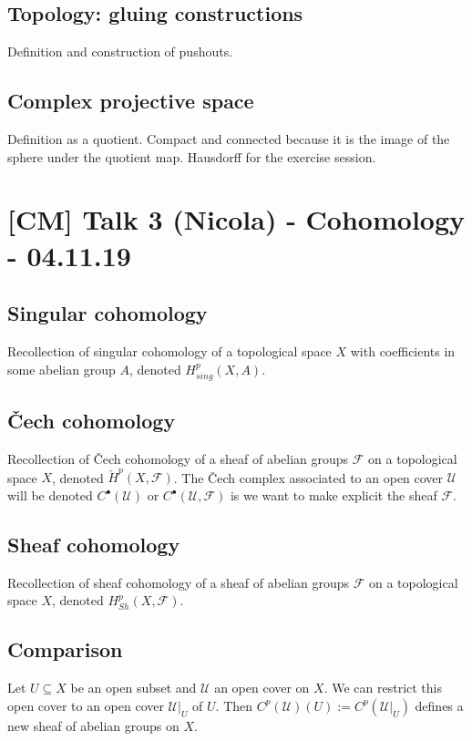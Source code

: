 \documentclass[11pt,A4]{article}
\theoremstyle{plain}
\theoremstyle{definition}
\theoremstyle{remark}
\newcommand{\1}{\mathbbm{1}}
\newcommand{\F}{\mathcal{F}}
\newcommand{\U}{\mathcal{U}}
\newcommand{\grd}{^{\bullet}}
\begin{document}
\subsection{Topology: gluing constructions}

Definition and construction of pushouts.

\subsection{Complex projective space}

Definition as a quotient.
Compact and connected because it is the image of the sphere under the quotient map.
Hausdorff for the exercise session.

\section{[CM] Talk 3 (Nicola) - Cohomology - 04.11.19}

\subsection{Singular cohomology}

Recollection of singular cohomology of a topological space $X$ with coefficients in some abelian group $A$, denoted $H^{p}_{sing}(X,A)$.

\subsection{\v{C}ech cohomology}

Recollection of \v{C}ech cohomology of a sheaf of abelian groups $\F$ on a topological space $X$, denoted $\check{H}^{p}(X,\F)$.
The \v{C}ech complex associated to an open cover $\U$ will be denoted $C\grd(\U)$ or $C\grd(\U,\F)$ is we want to make explicit the sheaf $\F$.

\subsection{Sheaf cohomology}

Recollection of sheaf cohomology of a sheaf of abelian groups $\F$ on a topological space $X$, denoted $H^{p}_{Sh}(X,\F)$.

\subsection{Comparison}

Let $U\subseteq X$ be an open subset and $\U$ an open cover on $X$.
We can restrict this open cover to an open cover $\U|_{U}$ of $U$.
Then $C^{p}(\U)(U):=C^{p}(\U|_{U})$ defines a new sheaf of abelian groups on $X$.
\end{document}
